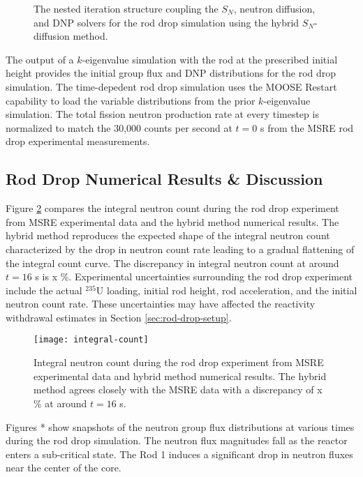 \begin{figure}[htb!]
  \centering
  \caption{The nested iteration structure coupling the $S_N$, neutron diffusion, and \gls{DNP}
  solvers for the rod drop simulation using the hybrid $S_N$-diffusion method.}
  \label{fig:rod-drop-coupling}
\end{figure}

The output of a $k$-eigenvalue simulation with the rod at the prescribed initial height provides
the initial group flux and \gls{DNP} distributions for the rod drop simulation. The time-depedent
rod drop simulation uses the \gls{MOOSE} Restart capability to load the variable distributions from
the prior $k$-eigenvalue simulation. The total fission neutron production rate at every timestep
is normalized to match the 30,000 counts per second at $t=0$ s from the \gls{MSRE} rod drop
experimental measurements.

\subsection{Rod Drop Numerical Results \& Discussion}

Figure \ref{fig:integral-count} compares the integral neutron count during the rod drop experiment
from \gls{MSRE} experimental data and the hybrid method numerical results. The hybrid method
reproduces the expected shape of the integral
neutron count characterized by the drop in neutron count rate leading to a gradual flattening of
the integral count curve. The discrepancy in integral neutron count at around $t=16$ s is x \%.
Experimental uncertainties surrounding the rod drop experiment include the actual $^{235}$U
loading, initial rod height, rod acceleration, and the initial neutron count rate. These uncertainties
may have affected the reactivity withdrawal estimates in Section \ref{sec:rod-drop-setup}.

\begin{figure}[t]
  \centering
  \texttt{[image: integral-count]}
  \caption{Integral neutron count during the rod drop experiment from \gls{MSRE} experimental data
  and hybrid method numerical results. The hybrid method agrees closely with the \gls{MSRE} data
  with a discrepancy of x \% at around $t=16$ s.}
  \label{fig:integral-count}
\end{figure}

Figures * show snapshots of the neutron group flux distributions at various times during the rod
drop simulation. The neutron flux magnitudes fall as the reactor enters a sub-critical state. The
Rod 1 induces a significant drop in neutron fluxes near the center of the core.

